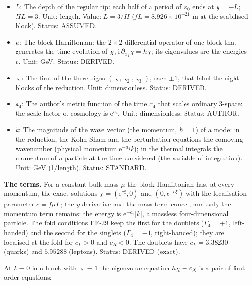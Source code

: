 \documentclass[
  10pt,
]{article}
\begin{document}
\begin{itemize}
  the zero mode. Unit: GeV. Value: \(\mu_{\psi i} = c/(fL)\) with the
  localisation \(c\) of the zero mode (doublets: \(\mu_Q = 5.2304\,H\),
  \(\mu_\ell = 9.2055\,H\)). Status: ASSUMED.
\item
  \(L\): The depth of the regular tip: each half of a period of \(x_0\)
  ends at \(y = -L\); \(HL = 3\). Unit: length. Value: \(L = 3/H\)
  (\(fL = 8.926\times10^{-21}\) m at the stabilised block). Status:
  ASSUMED.
\item
  \(h\): The block Hamiltonian: the \(2 \times 2\) differential operator
  of one block that generates the time evolution of \(\chi\),
  \(\mathrm{i}\,\partial_{x_4}\chi = h\chi\); its eigenvalues are the
  energies \(\varepsilon\). Unit: GeV. Status: DERIVED.
\item
  \(\varsigma\): The first of the three signs
  \((\varsigma, \varsigma_2, \varsigma_3)\), each \(\pm1\), that label
  the eight blocks of the reduction. Unit: dimensionless. Status:
  DERIVED.
\item
  \(a_4\): The author's metric function of the time \(x_4\) that scales
  ordinary 3-space: the scale factor of cosmology is
  \(\mathrm{e}^{a_4}\). Unit: dimensionless. Status: AUTHOR.
\item
  \(k\): The magnitude of the wave vector (the momentum, \(\hbar = 1\))
  of a mode: in the reduction, the Kohn-Sham and the perturbation
  equations the comoving wavenumber (physical momentum
  \(\mathrm{e}^{-a_4}k\)); in the thermal integrals the momentum of a
  particle at the time considered (the variable of integration). Unit:
  GeV (1/length). Status: STANDARD.
\end{itemize}

\textbf{The terms.} For a constant bulk mass \(\mu\) the block
Hamiltonian has, at every momentum, the exact solutions
\(\chi = (\mathrm{e}^{c\xi}, 0)\) and \((0, \mathrm{e}^{-c\xi})\) with
the localisation parameter \(c = f\mu L\); the \(y\) derivative and the
mass term cancel, and only the momentum term remains: the energy is
\(\mathrm{e}^{-a_4}\lvert k\rvert\), a massless four-dimensional
particle. The fold conditions FE-29 keep the first for the doublets
(\(\Gamma_4 = +1\), left-handed) and the second for the singlets
(\(\Gamma_4 = -1\), right-handed); they are localised at the fold for
\(c_L > 0\) and \(c_R < 0\). The doublets have \(c_L = 3.38230\)
(quarks) and \(5.95288\) (leptons). Status: DERIVED (exact).

At \(k = 0\) in a block with \(\varsigma = 1\) the eigenvalue equation
\(h\chi = \varepsilon\chi\) is a pair of first-order equations:
\end{document}
